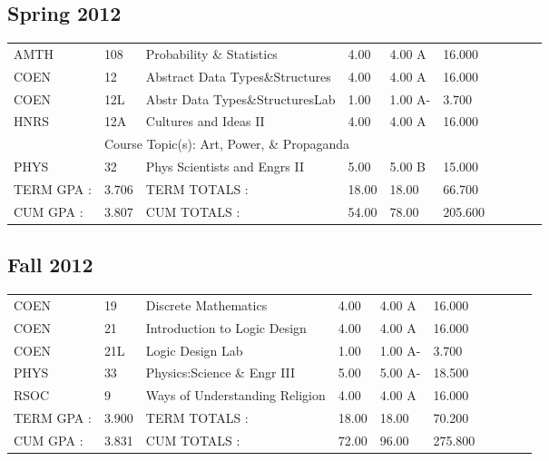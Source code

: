 \documentclass{scrartcl}\usepackage[T1]{fontenc}
\begin{document}
\subsection{Spring 2012}
\begin{tabular}{ l  l  l  l  l  l  l  l  l  l }
AMTH&108&Probability \& Statistics&4.00&4.00 A&16.000& & & & \\
COEN&12&Abstract Data Types\&Structures&4.00&4.00 A&16.000& & & & \\
COEN&12L&Abstr Data Types\&StructuresLab&1.00&1.00 A-&3.700& & & & \\
HNRS&12A&Cultures and Ideas II&4.00&4.00 A&16.000& & & & \\
\multicolumn{1}{l}{ }
&
\multicolumn{9}{l}{Course Topic(s): Art, Power, \& Propaganda}
\\
PHYS&32&Phys Scientists and Engrs II&5.00&5.00 B&15.000& & & & \\
\hline
TERM GPA :&3.706&TERM TOTALS :&18.00&18.00&66.700& & & & \\
CUM GPA :&3.807&CUM TOTALS :&54.00&78.00&205.600& & & & \\\end{tabular}
\subsection{Fall 2012}
\begin{tabular}{ l  l  l  l  l  l  l  l  l  l }
COEN&19&Discrete Mathematics&4.00&4.00 A&16.000& & & & \\
COEN&21&Introduction to Logic Design&4.00&4.00 A&16.000& & & & \\
COEN&21L&Logic Design Lab&1.00&1.00 A-&3.700& & & & \\
PHYS&33&Physics:Science \& Engr III&5.00&5.00 A-&18.500& & & & \\
RSOC&9&Ways of Understanding Religion&4.00&4.00 A&16.000& & & & \\
\hline
TERM GPA :&3.900&TERM TOTALS :&18.00&18.00&70.200& & & & \\
CUM GPA :&3.831&CUM TOTALS :&72.00&96.00&275.800& & & & \\\end{tabular}
\end{document}
